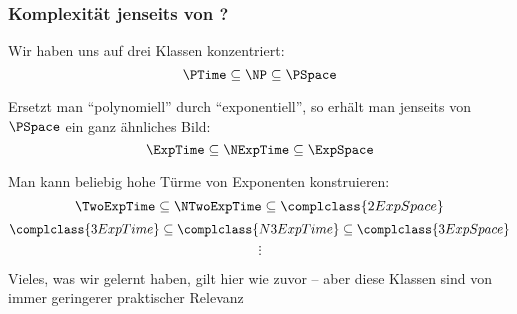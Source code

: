 \documentclass[aspectratio=1610,onlymath]{beamer}
\begin{document}
% 
% 
% 
% 


\begin{frame}\frametitle{Komplexität jenseits von \PSpace?}

Wir haben uns auf drei Klassen konzentriert:
\[ \PTime \subseteq \NP \subseteq \PSpace\]

Ersetzt man "`polynomiell"' durch "`exponentiell"', so erhält man jenseits von $\PSpace$ ein ganz ähnliches Bild:
\[ \ExpTime \subseteq \NExpTime \subseteq \ExpSpace\]\pause

Man kann beliebig hohe Türme von Exponenten konstruieren:
\[ \TwoExpTime \subseteq \NTwoExpTime \subseteq \complclass{2ExpSpace}\]
\[ \complclass{3ExpTime} \subseteq \complclass{N3ExpTime} \subseteq \complclass{3ExpSpace}\]
\[\vdots\]

Vieles, was wir gelernt haben, gilt hier wie zuvor -- aber diese Klassen sind von immer
geringerer praktischer Relevanz

\end{frame}
\end{document}
